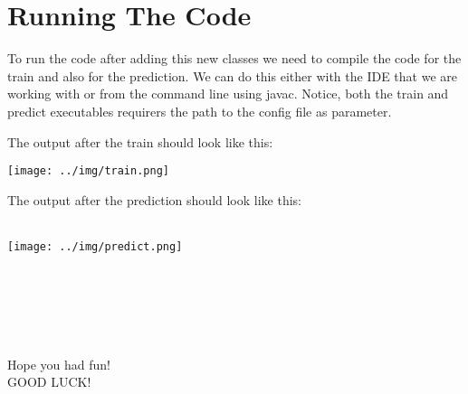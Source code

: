 \documentclass[11pt, oneside]{article}   	%
\begin{document}
\section{Running The Code}
To run the code after adding this new classes we need to compile the code for the train and also for the prediction. We can do this either with the IDE that we are working with or from the command line using javac.
Notice, both the train and predict executables requirers the path to the config file as parameter.

The output after the train should look like this: \\ 
\centerline{\texttt{[image: ../img/train.png]}}

The output after the prediction should look like this:\\ \\
\centerline{\texttt{[image: ../img/predict.png]}} \\ \\ \\ \\ \\
Hope you had fun!\\
GOOD LUCK! 
\end{document}
